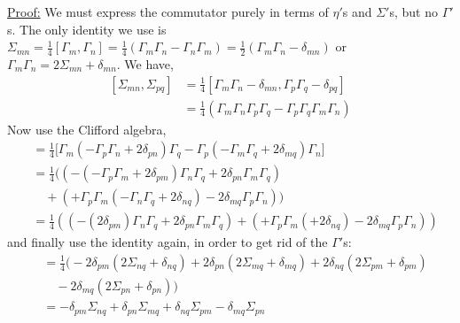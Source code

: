 \documentclass[a4paper,12pt]{article}
\numberwithin{equation}{section}
\numberwithin{exe}{section}
\newcommand{\G}{{\Gamma}}
\renewcommand{\d}{{\delta}}
\renewcommand{\S}{{\Sigma}}
\begin{document}
\underline{Proof:} 
We must express the commutator purely in terms of $\eta'$s and $\Sigma'$s, but no $\G'$s. The only identity we use is $\S_{mn}=\frac{1}{4}[\G_m,\G_n]=\frac{1}{4}\left( \G_m \G_n -\G_n \G_m \right)=\frac{1}{2}\left( \G_m \G_n - \delta_{mn} \right)$ or $\G_m\G_n=2\S_{mn}+\d_{mn}$. We have,
	\begin{align}\label{}
	[\S_{mn},\S_{pq}]&=\frac{1}{4}[\G_m \G_n -\delta_{mn},\G_p \G_q -\delta_{pq}] \nonumber \\
	&=\frac{1}{4} \left( \G_m \G_n\G_p \G_q - \G_p \G_q \G_m \G_n \right)
	\end{align}
Now use the Clifford algebra,
	\begin{align}\label{}
	& = \frac14 \Big[ \G_m \left( -\G_p\G_n+2\d_{pn} \right) \G_q - \G_p \left( -\G_m \G_q +2\d_{mq} \right) \G_n \Big] \nonumber \\
	& = \frac14 \Big( \left( -\left( -\G_p\G_m + 2\d_{pm} \right)\G_n \G_q+2\d_{pn} \G_m \G_q \right) \nonumber \\
	& \quad + \left( +\G_p\G_m \left( -\G_n \G_q +2\d_{nq} \right) -2\d_{mq} \G_p \G_n \right) \Big) \nonumber \\
	& = \frac14 \left( \left( -\left(  2\d_{pm} \right)\G_n \G_q+2\d_{pn} \G_m \G_q \right) + \left( +\G_p\G_m \left( +2\d_{nq} \right) -2\d_{mq} \G_p \G_n \right) \right)
	\end{align}
and finally use the identity again, in order to get rid of the $\G'$s:
	\begin{align}\label{}
	&=\frac{1}{4} \Big(   -  2\delta_{pm} \left( 2\Sigma_{nq}+\delta_{nq} \right)+2\delta_{pn} \left( 2\Sigma_{mq}+\delta_{mq} \right) + 2\delta_{nq} \left( 2\Sigma_{pm}+\delta_{pm} \right) \nonumber \\
	& \quad -2\delta_{mq} \left( 2\Sigma_{pn}+\delta_{pn} \right)   \Big) \nonumber \\
	&=   -  \delta_{pm}  \Sigma_{nq} +\delta_{pn}  \Sigma_{mq}  + \delta_{nq}  \Sigma_{pm}   -\delta_{mq}  \Sigma_{pn}  
	\end{align}
\end{document}
